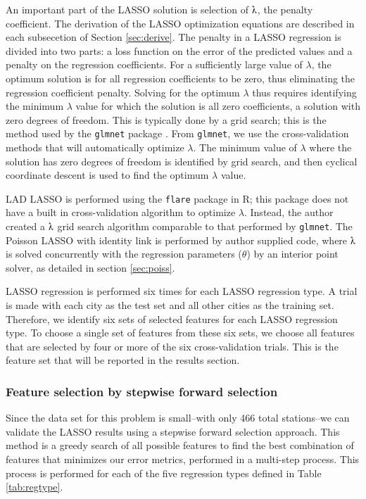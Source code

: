 \documentclass[11pt]{article}
\begin{document}
An important part of the LASSO solution is selection of $\lambdaup$, the penalty coefficient. The derivation of the LASSO optimization equations are described in each subsecetion of Section \ref{sec:derive}. The penalty in a LASSO regression is divided into two parts: a loss function on the error of the predicted values and a penalty on the regression coefficients. For a sufficiently large value of $\lambda$, the optimum solution is for all regression coefficients to be zero, thus eliminating the regression coefficient penalty. Solving for the optimum $\lambda$ thus requires identifying the minimum $\lambda$ value for which the solution is all zero coefficients, a solution with zero degrees of freedom. This is typically done by a grid search; this is the method used by the \texttt{glmnet} package \cite{friedman2010}. From \texttt{glmnet}, we use the cross-validation methods that will automatically optimize $\lambda$. The minimum value of $\lambda$ where the solution has zero degrees of freedom is identified by grid search, and then cyclical coordinate descent is used to find the optimum $\lambda$ value. 

LAD LASSO is performed using the \texttt{flare} package in R; this package does not have a built in cross-validation algorithm to optimize $\lambda$. Instead, the author created a $\lambdaup$ grid search algorithm comparable to that performed by \texttt{glmnet}. The Poisson LASSO with identity link is performed by author supplied code, where $\lambdaup$ is solved concurrently with the regression parameters ($\theta$) by an interior point solver, as detailed in section \ref{sec:poiss}.

LASSO regression is performed six times for each LASSO regression type. A trial is made with each city as the test set and all other cities as the training set. Therefore, we identify six sets of selected features for each LASSO regression type. To choose a single set of features from these six sets, we choose all features that are selected by four or more of the six cross-validation trials. This is the feature set that will be reported in the results section.

\subsubsection{Feature selection by stepwise forward selection}\label{sec:fs}
 
Since the data set for this problem is small--with only 466 total stations--we can validate the LASSO results using a stepwise forward selection approach. This method is a greedy search of all possible features to find the best combination of features that minimizes our error metrics, performed in a multi-step process. This process is performed for each of the five regression types defined in Table \ref{tab:regtype}. 
\end{document}
